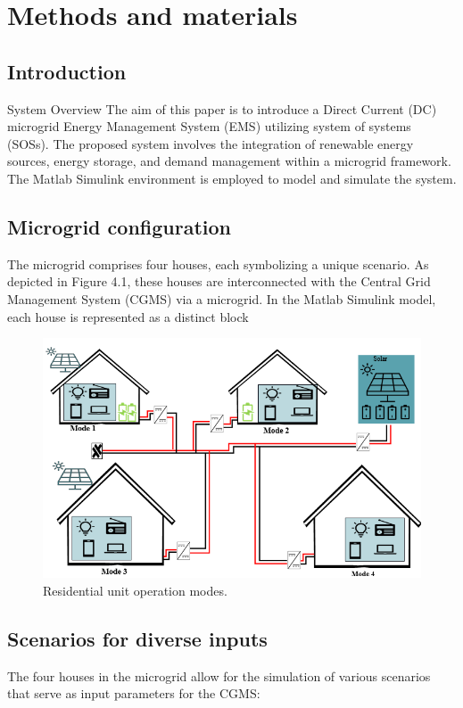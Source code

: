 \section{Methods and materials}
\subsection{Introduction}
System Overview The aim of this paper is to introduce a Direct Current (DC) microgrid Energy Management System (EMS) utilizing system of systems (SOSs). The proposed system involves the integration of renewable energy sources, energy storage, and demand management within a microgrid framework. The Matlab Simulink environment is employed to model and simulate the system.
\subsection{Microgrid configuration}
The microgrid comprises four houses, each symbolizing a unique scenario. As depicted in Figure 4.1, these houses are interconnected with the Central Grid Management System (CGMS) via a microgrid. In the Matlab Simulink model, each house is represented as a distinct block
\begin{figure}[H]
	\centering
	\includegraphics[totalheight=8cm]{Figures/re dc mg1.png}
	\caption{Residential unit operation modes.}
\end{figure}
\subsection{Scenarios for diverse inputs}
The four houses in the microgrid allow for the simulation of various scenarios that serve as input parameters for the CGMS:

